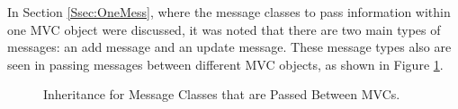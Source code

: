 \documentclass{article}[11pt]
\begin{document}
In Section \ref{Ssec:OneMess}, where the message classes to pass information
within one MVC object were discussed, it was noted that there are two main
types of messages: an add message and an update message.  These message types
also are seen in passing messages between different MVC objects, as shown
in Figure \ref{Fig:BetwMess}.  

\begin{figure}[ht]
  \begin{center}
    \caption{ Inheritance for Message Classes that are Passed Between MVCs. }
    \label{Fig:BetwMess}
  \end{center}
\end{figure}
\end{document}
